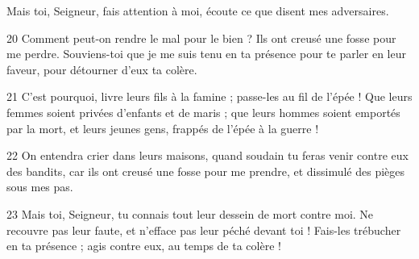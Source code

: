 Mais toi, Seigneur, fais attention à moi, écoute ce que disent mes adversaires.

20 Comment peut-on rendre le mal pour le bien ? Ils ont creusé une fosse pour me perdre. Souviens-toi que je me suis tenu en ta présence pour te parler en leur faveur, pour détourner d’eux ta colère.

21 C’est pourquoi, livre leurs fils à la famine ; passe-les au fil de l’épée ! Que leurs femmes soient privées d’enfants et de maris ; que leurs hommes soient emportés par la mort, et leurs jeunes gens, frappés de l’épée à la guerre !

22 On entendra crier dans leurs maisons, quand soudain tu feras venir contre eux des bandits, car ils ont creusé une fosse pour me prendre, et dissimulé des pièges sous mes pas.

23 Mais toi, Seigneur, tu connais tout leur dessein de mort contre moi. Ne recouvre pas leur faute, et n’efface pas leur péché devant toi ! Fais-les trébucher en ta présence ; agis contre eux, au temps de ta colère !